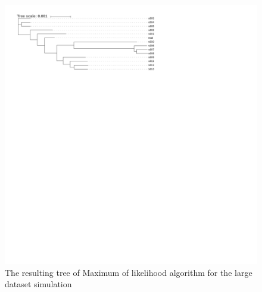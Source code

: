 \documentclass[]{article}
\theoremstyle{definition}
\begin{document}
\begin{figure}[H]
	\includegraphics*[width = \linewidth]{image/big_sim_tree_MLGO.pdf}
	\caption{The resulting tree of Maximum of likelihood algorithm for the large dataset simulation }
\end{figure}
\end{document}
